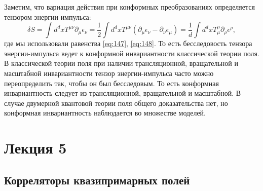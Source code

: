\documentclass[a4paper,12pt]{article}
\theoremstyle{definition}
\theoremstyle{definition}
\theoremstyle{definition}
\begin{document}
Заметим, что  вариация действия при конформных преобразованиях определяется тензором энергии импульса:
\begin{equation}
  \label{eq:183}
  \delta S=\int d^{d}x T^{\mu\nu}\partial_{\mu}\epsilon_{\nu}=\frac{1}{2} \int d^{d}x T^{\mu\nu}(\partial_{\mu}\epsilon_{\nu}-\partial_{\nu}\epsilon_{\mu})=\frac{1}{d}\int d^{d}x T^{\mu}_{\mu}\partial_{\rho}\epsilon^{\rho},
\end{equation}
где мы использовали равенства \eqref{eq:147}, \eqref{eq:148}. То есть бесследовость тензора
энергии-импульса ведет к конформной инвариантности классической теории поля. В классической теории
поля при наличии трансляционной, вращательной и масштабной инвариантности  тензор энергии-импульса
часто можно переопределить так, чтобы он был бесследовым. То есть конформная инвариантность следует
из трансляционной, вращательной и масштабной. В случае двумерной квантовой теории поля общего
доказательства нет, но конформная инвариантность наблюдается во множестве моделей.  

\section{Лекция 5}
\label{sec:lecture-5}

\subsection{Корреляторы квазипримарных полей}
\label{sec:quasiprimary-correlators}
\end{document}
